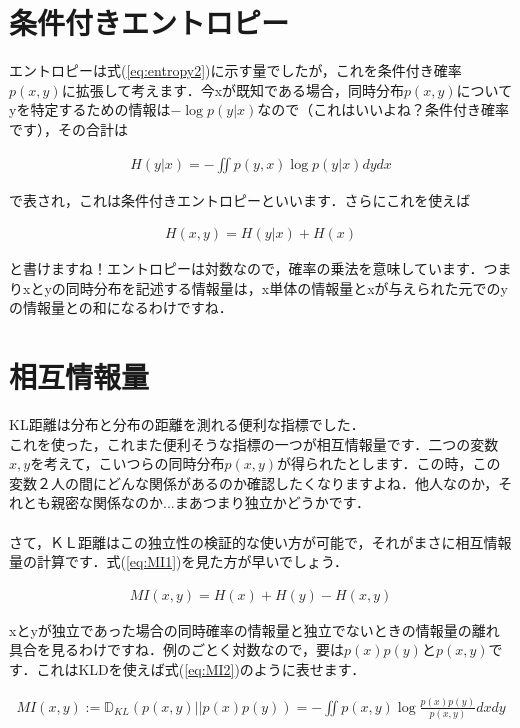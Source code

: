 \documentclass[11pt,a4paper,dvipdfmx]{ujreport}
\begin{document}
\section{条件付きエントロピー}
エントロピーは式(\ref{eq:entropy2})に示す量でしたが，これを条件付き確率$p(x,y)$に拡張して考えます．今xが既知である場合，同時分布$p(x,y)$についてyを特定するための情報は$-\log p(y|x)$なので（これはいいよね？条件付き確率です），その合計は

\begin{eqnarray}
\label{eq:cond_entropy1}
H(y|x) = - \iint p(y,x) \log p(y|x) dy dx
\end{eqnarray}

で表され，これは条件付きエントロピーといいます\cite{prml}\cite{dist}．さらにこれを使えば

\begin{eqnarray}
\label{eq:cond_entropy2}
H(x,y) = H(y|x) + H(x)
\end{eqnarray}

と書けますね！エントロピーは対数なので，確率の乗法を意味しています．つまりxとyの同時分布を記述する情報量は，x単体の情報量とxが与えられた元でのyの情報量との和になるわけですね．

\section{相互情報量}
KL距離は分布と分布の距離を測れる便利な指標でした．\\

これを使った，これまた便利そうな指標の一つが相互情報量です．二つの変数$x, y$を考えて，こいつらの同時分布$p(x,y)$が得られたとします．この時，この変数２人の間にどんな関係があるのか確認したくなりますよね．他人なのか，それとも親密な関係なのか...まあつまり独立かどうかです．\\
\\

さて，ＫＬ距離はこの独立性の検証的な使い方が可能で，それがまさに相互情報量の計算です．式(\ref{eq:MI1})を見た方が早いでしょう\cite{dist}．

\begin{eqnarray}
\label{eq:MI1}
MI(x,y) = H(x) + H(y) - H(x,y)
\end{eqnarray}

xとyが独立であった場合の同時確率の情報量と独立でないときの情報量の離れ具合を見るわけですね．例のごとく対数なので，要は$p(x)p(y)とp(x,y)$です．これはKLDを使えば式(\ref{eq:MI2})のように表せます．

\begin{eqnarray}
\label{eq:MI2}
  MI(x,y) := \mathbb{D}_{KL}(p(x,y) || p(x)p(y)) = -\iint p(x,y) \log \frac{p(x)p(y)}{p(x,y)} dxdy
\end{eqnarray}
\end{document}
